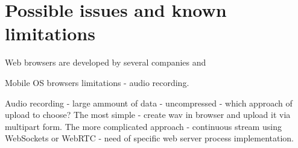 \section{Possible issues and known limitations}
Web browsers are developed by several companies and 



Mobile OS browsers limitations - audio recording.

Audio recording - large ammount of data - uncompressed - which approach of upload to choose? The most simple - create wav in browser and upload it via multipart form. The more complicated approach - continuous stream using WebSockets or WebRTC - need of specific web server process implementation.